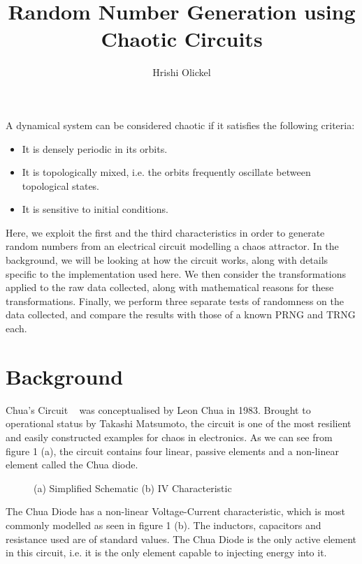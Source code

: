 \documentclass[jou,apacite]{apa6}
\title{Random Number Generation using Chaotic Circuits}
\author{Hrishi Olickel}
\affiliation{Yale-NUS College}
\begin{document}
\maketitle

A dynamical system can be considered chaotic if it satisfies the following criteria:
\begin{itemize}
\item It is densely periodic in its orbits.
\item It is topologically mixed, i.e. the orbits frequently oscillate between topological states.
\item It is sensitive to initial conditions.
\end{itemize}
Here, we exploit the first and the third characteristics in order to generate random numbers from an electrical circuit modelling a chaos attractor. In the background, we will be looking at how the circuit works, along with details specific to the implementation used here. We then consider the transformations applied to the raw data collected, along with mathematical reasons for these transformations. Finally, we perform three separate tests of randomness on the data collected, and compare the results with those of a known PRNG and TRNG each.

\section{Background}

Chua's Circuit ~\cite{mats} was conceptualised by Leon Chua in 1983. Brought to operational status by Takashi Matsumoto, the circuit is one of the most resilient and easily constructed examples for chaos in electronics. As we can see from figure 1 (a), the circuit contains four linear, passive elements and a non-linear element called the Chua diode. 

\begin{figure}[H]
\caption{(a) Simplified Schematic (b) IV Characteristic}
\endminipage\hfill
{}
\endminipage
\end{figure}

The Chua Diode has a non-linear Voltage-Current characteristic, which is most commonly modelled as seen in figure 1 (b). The inductors, capacitors and resistance used are of standard values. The Chua Diode is the only active element in this circuit, i.e. it is the only element capable to injecting energy into it.
\end{document}
